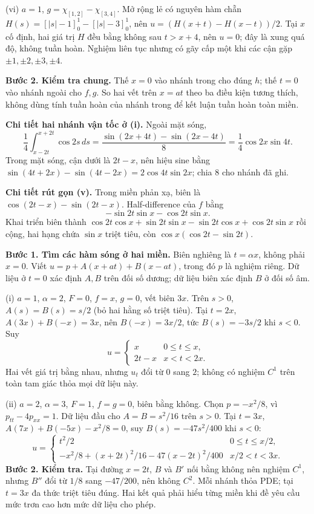 (vi) $a=1$, $g=\chi_{[1,2]}-\chi_{[3,4]}$. Mở rộng lẻ có nguyên hàm chẵn $H(s)=[|s|-1]_0^1-[|s|-3]_0^1$, nên $u=(H(x+t)-H(x-t))/2$. Tại $x$ cố định, hai giá trị $H$ đều bằng không sau $t>x+4$, nên $u=0$; đây là xung quá độ, không tuần hoàn. Nghiệm liên tục nhưng có gãy cấp một khi các cận gặp $\pm1,\pm2,\pm3,\pm4$.

\textbf{Bước 2. Kiểm tra chung.} Thế $x=0$ vào nhánh trong cho đúng $h$; thế $t=0$ vào nhánh ngoài cho $f,g$. So hai vết trên $x=at$ theo ba điều kiện tương thích, không dùng tính tuần hoàn của nhánh trong để kết luận tuần hoàn toàn miền.

\textbf{Chi tiết hai nhánh vận tốc ở (i).} Ngoài mặt sóng,
\[\frac14\int_{x-2t}^{x+2t}\cos2s\,ds
=\frac{\sin(2x+4t)-\sin(2x-4t)}8=\frac14\cos2x\sin4t.\]
Trong mặt sóng, cận dưới là $2t-x$, nên hiệu sine bằng $\sin(4t+2x)-\sin(4t-2x)=2\cos4t\sin2x$; chia $8$ cho nhánh đã ghi.

\textbf{Chi tiết rút gọn (v).} Trong miền phản xạ, biên là $\cos(2t-x)-\sin(2t-x)$. Half-difference của $f$ bằng
\[-\sin2t\sin x-\cos2t\sin x.\]
Khai triển biên thành $\cos2t\cos x+\sin2t\sin x-\sin2t\cos x+\cos2t\sin x$ rồi cộng, hai hạng chứa $\sin x$ triệt tiêu, còn $\cos x(\cos2t-\sin2t)$.

\textbf{Bước 1. Tìm các hàm sóng ở hai miền.} Biên nghiêng là $t=\alpha x$, không phải $x=0$. Viết $u=p+A(x+at)+B(x-at)$, trong đó $p$ là nghiệm riêng. Dữ liệu ở $t=0$ xác định $A,B$ trên đối số dương; dữ liệu biên xác định $B$ ở đối số âm.

(i) $a=1$, $\alpha=2$, $F=0$, $f=x$, $g=0$, vết biên $3x$. Trên $s>0$, $A(s)=B(s)=s/2$ (bỏ hai hằng số triệt tiêu). Tại $t=2x$, $A(3x)+B(-x)=3x$, nên $B(-x)=3x/2$, tức $B(s)=-3s/2$ khi $s<0$. Suy
\[u=\begin{cases}x&0\le t\le x,\\2t-x&x<t<2x.\end{cases}\]
Hai vết giá trị bằng nhau, nhưng $u_t$ đổi từ $0$ sang $2$; không có nghiệm $C^1$ trên toàn tam giác thỏa mọi dữ liệu này.

(ii) $a=2$, $\alpha=3$, $F=1$, $f=g=0$, biên bằng không. Chọn $p=-x^2/8$, vì $p_{tt}-4p_{xx}=1$. Dữ liệu đầu cho $A=B=s^2/16$ trên $s>0$. Tại $t=3x$, $A(7x)+B(-5x)-x^2/8=0$, suy $B(s)=-47s^2/400$ khi $s<0$:
\[u=\begin{cases}t^2/2&0\le t\le x/2,\\-x^2/8+(x+2t)^2/16-47(x-2t)^2/400&x/2<t<3x.\end{cases}\]
\textbf{Bước 2. Kiểm tra.} Tại đường $x=2t$, $B$ và $B'$ nối bằng không nên nghiệm $C^1$, nhưng $B''$ đổi từ $1/8$ sang $-47/200$, nên không $C^2$. Mỗi nhánh thỏa PDE; tại $t=3x$ đa thức triệt tiêu đúng. Hai kết quả phải hiểu từng miền khi đề yêu cầu mức trơn cao hơn mức dữ liệu cho phép.


